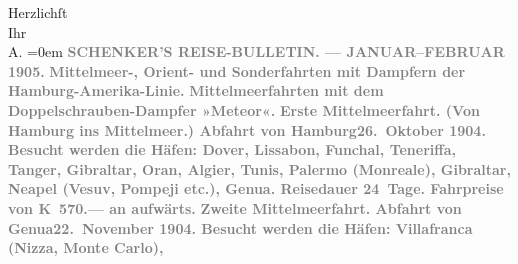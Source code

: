 \begin{ledgroupsized}[t]{13cm}
           Herzlichſt{\\[\baselineskip]}Ihr{\\[\baselineskip]}\spacefill\mbox{A.}\pend
           \leftskip=0em{}{\bigskip}\pstart
           \noindent{}\centering{}{\pb}\textcolor{gray}{\textbf{SCHENKER’S REISE-BULLETIN. — JANUAR–FEBRUAR 1905.}}\pend
           \pstart
           \noindent{}\centering{}\textcolor{gray}{\textbf{Mittelmeer-, Orient- und Sonderfahrten mit
                  Dampfern der Hamburg-Amerika-Linie.}}\pend
           {\bigskip}\pstart
           \noindent{}\centering{}\textcolor{gray}{\textbf{Mittelmeerfahrten mit dem
                  Doppelschrauben-Dampfer »Meteor«.}}\pend
           \pstart
           \noindent{}\textcolor{gray}{\textbf{\textbf{Erste Mittelmeerfahrt.}
                  (Von Hamburg ins Mittelmeer.) Abfahrt von Hamburg\textbf{26. Oktober 1904}. Besucht werden die Häfen: Dover, Lissabon, Funchal, Teneriffa, Tanger, Gibraltar, Oran, Algier,
                     Tunis, Palermo (Monreale), Gibraltar, Neapel (Vesuv, Pompeji
                  etc.), Genua. Reisedauer 24 Tage. Fahrpreise von
                     \textbf{K 570.—} an aufwärts.}}\pend
           \pstart
           \textcolor{gray}{\textbf{\textbf{Zweite Mittelmeerfahrt.}
                  Abfahrt von Genua\textbf{22. November 1904}. Besucht werden die Häfen: Villafranca
                     (Nizza, Monte
                     Carlo), \label{T_L01495_1v}}}
\end{ledgroupsized}
